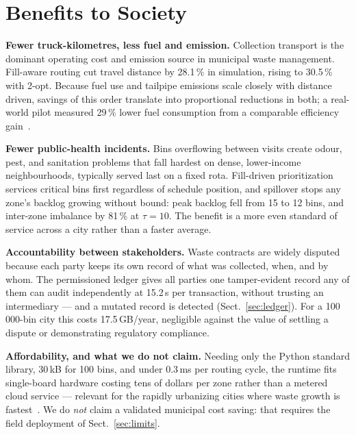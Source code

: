 \documentclass{llncs}
\begin{document}
\section{Benefits to Society}
\label{sec:society}

\textbf{Fewer truck-kilometres, less fuel and emission.} Collection transport
is the dominant operating cost and emission source in municipal waste
management. Fill-aware routing cut travel distance by 28.1\,\% in simulation,
rising to 30.5\,\% with 2-opt. Because fuel use and tailpipe emissions scale
closely with distance driven, savings of this order translate into
proportional reductions in both; a real-world pilot measured 29\,\% lower fuel
consumption from a comparable efficiency gain~\cite{addas}.

\textbf{Fewer public-health incidents.} Bins overflowing between visits create
odour, pest, and sanitation problems that fall hardest on dense, lower-income
neighbourhoods, typically served last on a fixed rota. Fill-driven
prioritization services critical bins first regardless of schedule position,
and spillover stops any zone's backlog growing without bound: peak backlog fell
from 15 to 12 bins, and inter-zone imbalance by 81\,\% at $\tau=10$. The
benefit is a more even standard of service across a city rather than a faster
average.

\textbf{Accountability between stakeholders.} Waste contracts are widely
disputed because each party keeps its own record of what was collected, when,
and by whom. The permissioned ledger gives all parties one tamper-evident
record any of them can audit independently at 15.2\,\textmu s per transaction,
without trusting an intermediary --- and a mutated record is detected
(Sect.~\ref{sec:ledger}). For a 100\,000-bin city this costs 17.5\,GB/year,
negligible against the value of settling a dispute or demonstrating regulatory
compliance.

\textbf{Affordability, and what we do not claim.} Needing only the Python
standard library, 30\,kB for 100 bins, and under 0.3\,ms per routing cycle, the
runtime fits single-board hardware costing tens of dollars per zone rather than
a metered cloud service --- relevant for the rapidly urbanizing cities where
waste growth is fastest~\cite{worldbank}. We do \emph{not} claim a validated
municipal cost saving: that requires the field deployment of
Sect.~\ref{sec:limits}.

\end{document}

